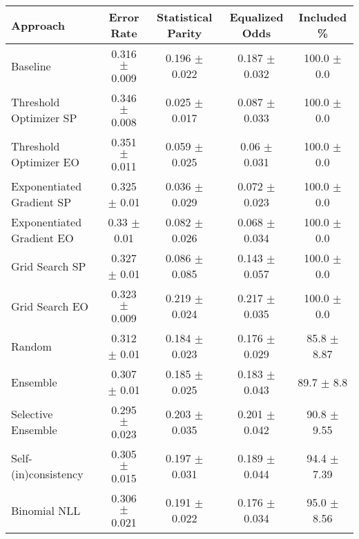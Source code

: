 \begin{tabular} {lcccc}
\toprule
\textbf{Approach} & \textbf{Error Rate} & \textbf{Statistical Parity} & \textbf{Equalized Odds} & \textbf{Included \%} \\ \midrule
Baseline & 0.316 $\pm$ 0.009 & 0.196 $\pm$ 0.022 & 0.187 $\pm$ 0.032 & \cellcolor{gold!30}100.0 $\pm$ 0.0 \\ 
Threshold Optimizer SP & 0.346 $\pm$ 0.008 & \cellcolor{gold!30}0.025 $\pm$ 0.017 & 0.087 $\pm$ 0.033 & \cellcolor{gold!30}100.0 $\pm$ 0.0 \\ 
Threshold Optimizer EO & 0.351 $\pm$ 0.011 & \cellcolor{bronze!30}0.059 $\pm$ 0.025 & \cellcolor{gold!30}0.06 $\pm$ 0.031 & \cellcolor{gold!30}100.0 $\pm$ 0.0 \\ 
Exponentiated Gradient SP & 0.325 $\pm$ 0.01 & \cellcolor{silver!30}0.036 $\pm$ 0.029 & \cellcolor{bronze!30}0.072 $\pm$ 0.023 & \cellcolor{gold!30}100.0 $\pm$ 0.0 \\ 
Exponentiated Gradient EO & 0.33 $\pm$ 0.01 & 0.082 $\pm$ 0.026 & \cellcolor{silver!30}0.068 $\pm$ 0.034 & \cellcolor{gold!30}100.0 $\pm$ 0.0 \\ 
Grid Search SP & 0.327 $\pm$ 0.01 & 0.086 $\pm$ 0.085 & 0.143 $\pm$ 0.057 & \cellcolor{gold!30}100.0 $\pm$ 0.0 \\ 
Grid Search EO & 0.323 $\pm$ 0.009 & 0.219 $\pm$ 0.024 & 0.217 $\pm$ 0.035 & \cellcolor{gold!30}100.0 $\pm$ 0.0 \\ 
Random & 0.312 $\pm$ 0.01 & 0.184 $\pm$ 0.023 & 0.176 $\pm$ 0.029 & 85.8 $\pm$ 8.87 \\ 
Ensemble & 0.307 $\pm$ 0.01 & 0.185 $\pm$ 0.025 & 0.183 $\pm$ 0.043 & 89.7 $\pm$ 8.8 \\ 
Selective Ensemble & \cellcolor{gold!30}0.295 $\pm$ 0.023 & 0.203 $\pm$ 0.035 & 0.201 $\pm$ 0.042 & 90.8 $\pm$ 9.55 \\ 
Self-(in)consistency & \cellcolor{silver!30}0.305 $\pm$ 0.015 & 0.197 $\pm$ 0.031 & 0.189 $\pm$ 0.044 & 94.4 $\pm$ 7.39 \\ 
Binomial NLL & \cellcolor{bronze!30}0.306 $\pm$ 0.021 & 0.191 $\pm$ 0.022 & 0.176 $\pm$ 0.034 & 95.0 $\pm$ 8.56 \\ 
\bottomrule
\end{tabular}
